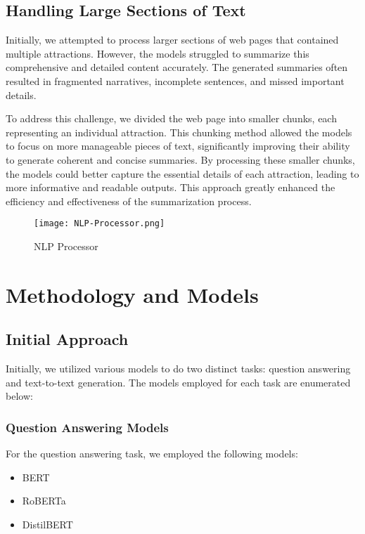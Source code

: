 \documentclass[conference]{IEEEtran}
\begin{document}
    \subsection{Handling Large Sections of Text}
    Initially, we attempted to process larger sections of web pages that contained multiple attractions. However, the models struggled to summarize this comprehensive and detailed content accurately. The generated summaries often resulted in fragmented narratives, incomplete sentences, and missed important details.

    To address this challenge, we divided the web page into smaller chunks, each representing an individual attraction. This chunking method allowed the models to focus on more manageable pieces of text, significantly improving their ability to generate coherent and concise summaries. By processing these smaller chunks, the models could better capture the essential details of each attraction, leading to more informative and readable outputs. This approach greatly enhanced the efficiency and effectiveness of the summarization process.

    \begin{figure}
        \centering
        \texttt{[image: NLP-Processor.png]}
        \caption{NLP Processor}
        \label{fig:nlp-processor}
    \end{figure}

\section{Methodology and Models}

    \subsection{Initial Approach}

        Initially, we utilized various models to do two distinct tasks: question answering and text-to-text generation. The models employed for each task are enumerated below:

        \subsubsection{Question Answering Models}
            For the question answering task, we employed the following models:
            \begin{itemize}
                \item BERT
                \item RoBERTa
                \item DistilBERT
            \end{itemize}
\end{document}
